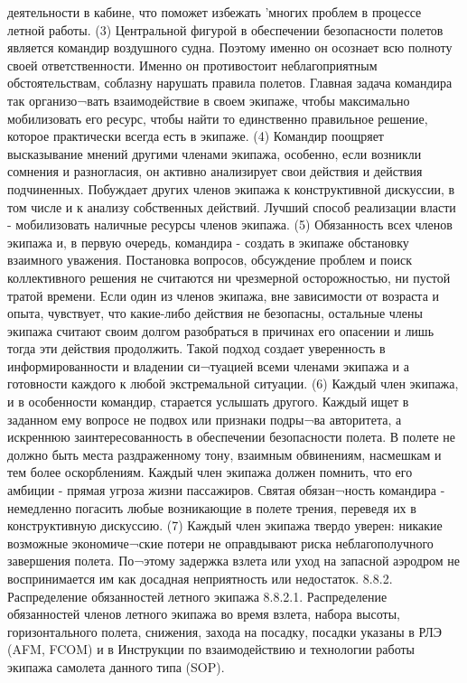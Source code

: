 деятельности в кабине, что поможет избежать 'многих проблем в процессе летной работы.
(3) Центральной фигурой в обеспечении безопасности полетов является командир воздушного судна. Поэтому именно он осознает всю полноту своей ответственности. Именно он противостоит неблагоприятным обстоятельствам, соблазну нарушать правила полетов. Главная задача командира так организо¬вать взаимодействие в своем экипаже, чтобы максимально мобилизовать его ресурс, чтобы найти то единственно правильное решение, которое практически всегда есть в экипаже.
(4) Командир поощряет высказывание мнений другими членами экипажа, особенно, если возникли сомнения и разногласия, он активно анализирует свои действия и действия подчиненных. Побуждает других членов экипажа к конструктивной дискуссии, в том числе и к анализу собственных действий. Лучший способ реализации власти - мобилизовать наличные ресурсы членов экипажа.
(5) Обязанность всех членов экипажа и, в первую очередь, командира - создать в экипаже обстановку взаимного уважения. Постановка вопросов, обсуждение проблем и поиск коллективного решения не считаются ни чрезмерной осторожностью, ни пустой тратой времени. Если один из членов экипажа, вне зависимости от возраста и опыта, чувствует, что какие-либо действия не безопасны, остальные члены экипажа считают своим долгом разобраться в причинах его опасении и лишь тогда эти действия продолжить. Такой подход создает уверенность в информированности и владении си¬туацией всеми членами экипажа и а готовности каждого к любой экстремальной ситуации.
(6) Каждый член экипажа, и в особенности командир, старается услышать другого. Каждый ищет в заданном ему вопросе не подвох или признаки подры¬ва авторитета, а искреннюю заинтересованность в обеспечении безопасности полета. В полете не должно быть места раздраженному тону, взаимным обвинениям, насмешкам и тем более оскорблениям. Каждый член экипажа должен помнить, что его амбиции - прямая угроза жизни пассажиров. Святая обязан¬ность командира - немедленно погасить любые возникающие в полете трения, переведя их в конструктивную дискуссию.
(7) Каждый член экипажа твердо уверен: никакие возможные экономиче¬ские потери не оправдывают риска неблагополучного завершения полета. По¬этому задержка взлета или уход на запасной аэродром не воспринимается им как досадная неприятность или недостаток.
8.8.2. Распределение обязанностей летного экипажа
8.8.2.1. Распределение обязанностей членов летного экипажа во время взлета, набора высоты, горизонтального полета, снижения, захода на посадку, посадки указаны в РЛЭ (AFM, FCOM) и в Инструкции по взаимодействию и технологии работы экипажа самолета данного типа (SOP).
